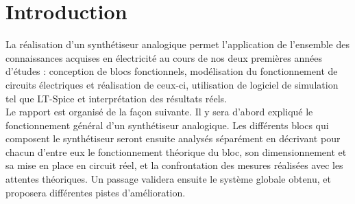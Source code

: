 \chapter{Introduction}
La réalisation d'un synthétiseur analogique permet l'application
de l'ensemble des connaissances acquises en électricité au cours
de nos deux premières années d'études : conception de blocs fonctionnels, 
modélisation du fonctionnement de circuits électriques et réalisation de ceux-ci,
utilisation de logiciel de simulation tel que LT-Spice et interprétation des résultats réels. \\

Le rapport est organisé de la façon suivante. Il y sera d'abord expliqué
le fonctionnement général d'un synthétiseur analogique. Les 
différents blocs qui composent le synthétiseur seront ensuite
analysés séparément en décrivant pour chacun d'entre eux le
fonctionnement théorique du bloc, son dimensionnement et sa
mise en place en circuit réel, et la confrontation des mesures
réalisées avec les attentes théoriques. Un passage validera ensuite le système globale obtenu,
et proposera différentes pistes d'amélioration.